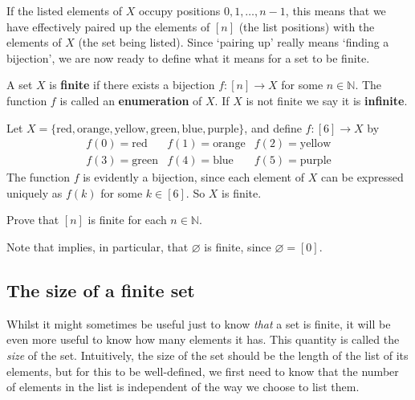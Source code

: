 If the listed elements of $X$ occupy positions $0,1,\dots,{n-1}$, this means that we have effectively paired up the elements of $[n]$ (the list positions) with the elements of $X$ (the set being listed). Since `pairing up' really means `finding a bijection', we are now ready to define what it means for a set to be finite.

\begin{definition}
\label{defFiniteSet}
A set $X$ is \textbf{finite} if there exists a bijection $f : [n] \to X$ for some $n \in \mathbb{N}$. The function $f$ is called an \textbf{enumeration} of $X$. If $X$ is not finite we say it is \textbf{infinite}.
\end{definition}

\begin{example}
\label{exSomeFiniteSets}
Let $X = \{ \text{red}, \text{orange}, \text{yellow}, \text{green}, \text{blue}, \text{purple} \}$, and define $f : [6] \to X$ by
\[ \begin{matrix}
f(0) = \text{red} & f(1) = \text{orange} & f(2) = \text{yellow} \\
f(3) = \text{green} & f(4) = \text{blue} & f(5) = \text{purple}
\end{matrix} \]
The function $f$ is evidently a bijection, since each element of $X$ can be expressed uniquely as $f(k)$ for some $k \in [6]$. So $X$ is finite.
\end{example}

\begin{exercise}
\label{exBracketNIsFinite}
Prove that $[n]$ is finite for each $n \in \mathbb{N}$.
\end{exercise}

Note that  implies, in particular, that $\varnothing$ is finite, since $\varnothing = [0]$.

\subsection*{The size of a finite set}

Whilst it might sometimes be useful just to know \textit{that} a set is finite, it will be even more useful to know how many elements it has. This quantity is called the \textit{size} of the set. Intuitively, the size of the set should be the length of the list of its elements, but for this to be well-defined, we first need to know that the number of elements in the list is independent of the way we choose to list them.

